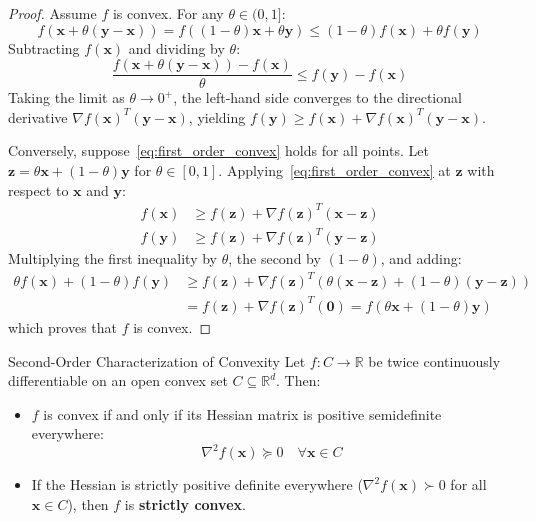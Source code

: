 \begin{proof}
Assume $f$ is convex. For any $\theta \in (0, 1]$:
\begin{equation}
f(\mathbf{x} + \theta(\mathbf{y} - \mathbf{x})) = f((1 - \theta)\mathbf{x} + \theta \mathbf{y}) \le (1 - \theta)f(\mathbf{x}) + \theta f(\mathbf{y})
\end{equation}
Subtracting $f(\mathbf{x})$ and dividing by $\theta$:
\begin{equation}
\frac{f(\mathbf{x} + \theta(\mathbf{y} - \mathbf{x})) - f(\mathbf{x})}{\theta} \le f(\mathbf{y}) - f(\mathbf{x})
\end{equation}
Taking the limit as $\theta \to 0^+$, the left-hand side converges to the directional derivative $\nabla f(\mathbf{x})^T (\mathbf{y} - \mathbf{x})$, yielding $f(\mathbf{y}) \ge f(\mathbf{x}) + \nabla f(\mathbf{x})^T (\mathbf{y} - \mathbf{x})$.

Conversely, suppose~\eqref{eq:first_order_convex} holds for all points. Let $\mathbf{z} = \theta \mathbf{x} + (1 - \theta)\mathbf{y}$ for $\theta \in [0, 1]$. Applying~\eqref{eq:first_order_convex} at $\mathbf{z}$ with respect to $\mathbf{x}$ and $\mathbf{y}$:
\begin{align}
f(\mathbf{x}) &\ge f(\mathbf{z}) + \nabla f(\mathbf{z})^T (\mathbf{x} - \mathbf{z}) \\
f(\mathbf{y}) &\ge f(\mathbf{z}) + \nabla f(\mathbf{z})^T (\mathbf{y} - \mathbf{z})
\end{align}
Multiplying the first inequality by $\theta$, the second by $(1 - \theta)$, and adding:
\begin{align}
\theta f(\mathbf{x}) + (1 - \theta)f(\mathbf{y}) &\ge f(\mathbf{z}) + \nabla f(\mathbf{z})^T \left( \theta(\mathbf{x} - \mathbf{z}) + (1 - \theta)(\mathbf{y} - \mathbf{z}) \right) \nonumber \\
&= f(\mathbf{z}) + \nabla f(\mathbf{z})^T (\mathbf{0}) = f(\theta \mathbf{x} + (1 - \theta)\mathbf{y})
\end{align}
which proves that $f$ is convex.
\end{proof}

\begin{theorembox}{Second-Order Characterization of Convexity}
Let $f: C \to \mathbb{R}$ be twice continuously differentiable on an open convex set $C \subseteq \mathbb{R}^d$. Then:
\begin{itemize}
    \item $f$ is convex if and only if its Hessian matrix is positive semidefinite everywhere:
    \begin{equation}
    \nabla^2 f(\mathbf{x}) \succeq 0 \quad \forall \mathbf{x} \in C
    \end{equation}
    \item If the Hessian is strictly positive definite everywhere ($\nabla^2 f(\mathbf{x}) \succ 0$ for all $\mathbf{x} \in C$), then $f$ is \textbf{strictly convex}.
\end{itemize}
\end{theorembox}

